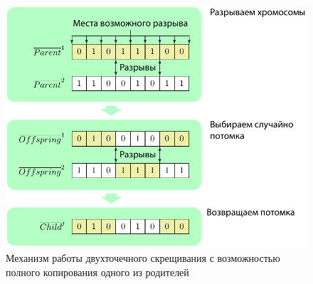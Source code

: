 \begin{figure} [h]
  \center
  \includegraphics [scale=0.8] {HML_TwopointCrossoverWithCopying_Sheme}
  \caption{Механизм работы двухточечного скрещивания с возможностью полного копирования одного из родителей} 
  \label{img:HML_TwopointCrossoverWithCopying_Sheme}  
\end{figure}